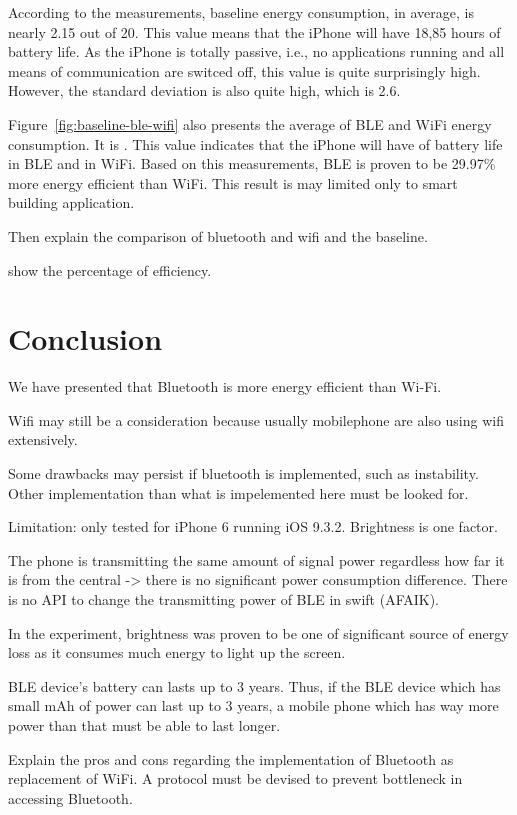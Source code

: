 \documentclass[journal]{vgtc}                %
\begin{document}
According to the measurements, baseline energy consumption, in average, is nearly 2.15 out of 20. This value means that the iPhone will have 18,85 hours of battery life. As the iPhone is totally passive, i.e., no applications running and all means of communication are switced off, this value is quite surprisingly high. However, the standard deviation is also quite high, which is 2.6.

Figure~\ref{fig:baseline-ble-wifi} also presents the average of BLE and WiFi energy consumption. It is . This value indicates that the iPhone will have of battery life in BLE and in WiFi. Based on this measurements, BLE is proven to be 29.97\% more energy efficient than WiFi. This result is may limited only to smart building application.

Then explain the comparison of bluetooth and wifi and the baseline.

show the percentage of efficiency.



\section{Conclusion} %
\label{sec:conclusion}
We have presented that Bluetooth is more energy efficient than Wi-Fi.

Wifi may still be a consideration because usually mobilephone are also using wifi extensively.

Some drawbacks may persist if bluetooth is implemented, such as instability. Other implementation than what is impelemented here must be looked for.

Limitation: only tested for iPhone 6 running iOS 9.3.2.
Brightness is one factor.

The phone is transmitting the same amount of signal power regardless how far it is from the central -> there is no significant power consumption difference.
There is no API to change the transmitting power of BLE in swift (AFAIK).

In the experiment, brightness was proven to be one of significant source of energy loss as it consumes much energy to light up the screen.

BLE device's battery can lasts up to 3 years. Thus, if the BLE device which has small mAh of power can last up to 3 years, a mobile phone which has way more power than that must be able to last longer.

Explain the pros and cons regarding the implementation of Bluetooth as replacement of WiFi. A protocol must be devised to prevent bottleneck in accessing Bluetooth. 





\end{document}
